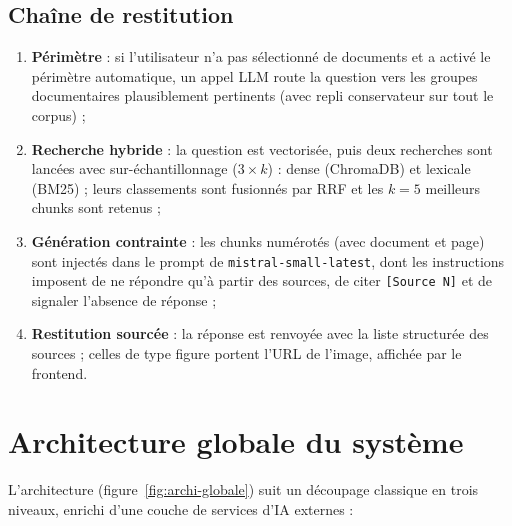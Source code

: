 \subsection{Chaîne de restitution}
\begin{enumerate}
  \item \textbf{Périmètre} : si l'utilisateur n'a pas sélectionné de documents et a activé
        le périmètre automatique, un appel LLM route la question vers les groupes
        documentaires plausiblement pertinents (avec repli conservateur sur tout le corpus) ;
  \item \textbf{Recherche hybride} : la question est vectorisée, puis deux recherches sont
        lancées avec sur-échantillonnage (\(3 \times k\)) : dense (ChromaDB) et lexicale
        (BM25) ; leurs classements sont fusionnés par RRF et les \(k=5\) meilleurs chunks
        sont retenus ;
  \item \textbf{Génération contrainte} : les chunks numérotés (avec document et page) sont
        injectés dans le prompt de \texttt{mistral-small-latest}, dont les instructions
        imposent de ne répondre qu'à partir des sources, de citer \texttt{[Source N]} et de
        signaler l'absence de réponse ;
  \item \textbf{Restitution sourcée} : la réponse est renvoyée avec la liste structurée des
        sources ; celles de type figure portent l'URL de l'image, affichée par le frontend.
\end{enumerate}

\section{Architecture globale du système}
\label{sec:archi-globale}

L'architecture (figure~\ref{fig:archi-globale}) suit un découpage classique en trois
niveaux, enrichi d'une couche de services d'IA externes :

